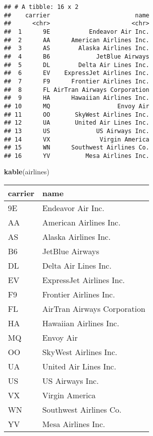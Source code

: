 \documentclass[]{book}
\newenvironment{Shaded}{\begin{snugshade}}{\end{snugshade}}
\newcommand{\KeywordTok}[1]{\textcolor[rgb]{0.13,0.29,0.53}{\textbf{#1}}}
\newcommand{\NormalTok}[1]{#1}
\begin{document}
\begin{verbatim}
## # A tibble: 16 x 2
##    carrier                        name
##      <chr>                       <chr>
##  1      9E           Endeavor Air Inc.
##  2      AA      American Airlines Inc.
##  3      AS        Alaska Airlines Inc.
##  4      B6             JetBlue Airways
##  5      DL        Delta Air Lines Inc.
##  6      EV    ExpressJet Airlines Inc.
##  7      F9      Frontier Airlines Inc.
##  8      FL AirTran Airways Corporation
##  9      HA      Hawaiian Airlines Inc.
## 10      MQ                   Envoy Air
## 11      OO       SkyWest Airlines Inc.
## 12      UA       United Air Lines Inc.
## 13      US             US Airways Inc.
## 14      VX              Virgin America
## 15      WN      Southwest Airlines Co.
## 16      YV          Mesa Airlines Inc.
\end{verbatim}

\begin{Shaded}
\begin{Highlighting}[]
\KeywordTok{kable}\NormalTok{(airlines)}
\end{Highlighting}
\end{Shaded}

\begin{tabular}{l|l}
\hline
carrier & name\\
\hline
9E & Endeavor Air Inc.\\
\hline
AA & American Airlines Inc.\\
\hline
AS & Alaska Airlines Inc.\\
\hline
B6 & JetBlue Airways\\
\hline
DL & Delta Air Lines Inc.\\
\hline
EV & ExpressJet Airlines Inc.\\
\hline
F9 & Frontier Airlines Inc.\\
\hline
FL & AirTran Airways Corporation\\
\hline
HA & Hawaiian Airlines Inc.\\
\hline
MQ & Envoy Air\\
\hline
OO & SkyWest Airlines Inc.\\
\hline
UA & United Air Lines Inc.\\
\hline
US & US Airways Inc.\\
\hline
VX & Virgin America\\
\hline
WN & Southwest Airlines Co.\\
\hline
YV & Mesa Airlines Inc.\\
\hline
\end{tabular}
\end{document}
